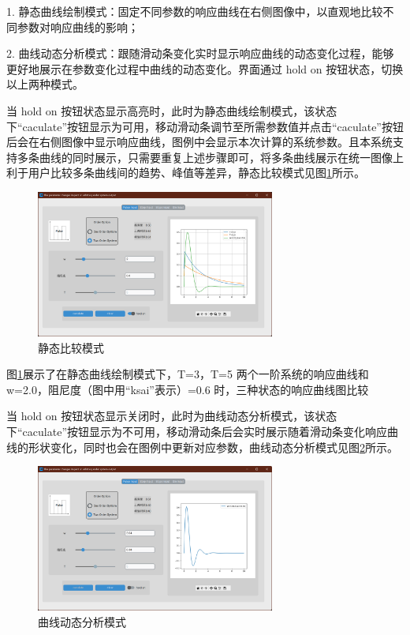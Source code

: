 \documentclass[12pt]{ctexart}
\begin{document}
1. 静态曲线绘制模式：固定不同参数的响应曲线在右侧图像中，以直观地比较不同参数对响应曲线的影响；

2. 曲线动态分析模式：跟随滑动条变化实时显示响应曲线的动态变化过程，能够更好地展示在参数变化过程中曲线的动态变化。界面通过 hold on 按钮状态，切换以上两种模式。

当 hold on 按钮状态显示高亮时，此时为静态曲线绘制模式，该状态下“caculate”按钮显示为可用，移动滑动条调节至所需参数值并点击“caculate”按钮后会在右侧图像中显示响应曲线，图例中会显示本次计算的系统参数。且本系统支持多条曲线的同时展示，只需要重复上述步骤即可，将多条曲线展示在统一图像上利于用户比较多条曲线间的趋势、峰值等差异，静态比较模式见图\ref{figure7}所示。

\begin{figure}[htbp]
    \centering
    \includegraphics[width=0.7\textwidth]{img/static_draw.png}
    \caption{静态比较模式}\label{figure7}
\end{figure}

图\ref{figure7}展示了在静态曲线绘制模式下，T=3，T=5 两个一阶系统的响应曲线和 w=2.0，阻尼度（图中用“ksai”表示）=0.6 时，三种状态的响应曲线图比较

当 hold on 按钮状态显示关闭时，此时为曲线动态分析模式，该状态下“caculate”按钮显示为不可用，移动滑动条后会实时展示随着滑动条变化响应曲线的形状变化，同时也会在图例中更新对应参数，曲线动态分析模式见图\ref{figure8}所示。

\begin{figure}[htbp]
    \centering
    \includegraphics[width=0.7\textwidth]{img/dynamic.png}
    \caption{曲线动态分析模式}\label{figure8}
\end{figure}
\end{document}
